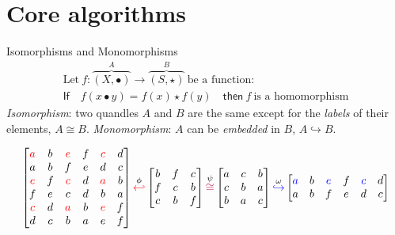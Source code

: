 \section{Core algorithms}
\frame{\sectionpage}

\begin{frame}{Isomorphisms and Monomorphisms}
\begin{multline*}
    \text{Let}~f:\overbrace{(X,\bullet)}^A\to\overbrace{(S,\star)}^B~\text{be a function:}\\  \textsf{If}\quad f(x\bullet y) = f(x)\star f(y)\quad \textsf{then}~f~\text{is a homomorphism}
\end{multline*}
\emph{Isomorphism}: two quandles $A$ and $B$ are the same except for the \emph{labels} of their elements, $A \cong B$.\newline
\emph{Monomorphism}: $A$ can be \emph{embedded} in $B$, $A \hookrightarrow B$.
\begin{center}
    \textcolor{darkred}{} 
\end{center}
\small
\[\begin{bmatrix}
     \textcolor{red}{a} & b & \textcolor{red}{e} & f & \textcolor{red}{c} & d \\
     a & b & f & e & d & c \\
     \textcolor{red}{e} & f & \textcolor{red}{c} & d & \textcolor{red}{a} & b \\
     f & e & c & d & b & a \\
     \textcolor{red}{c} & d & \textcolor{red}{a} & b & \textcolor{red}{e} & f \\
     d & c & b & a & e & f \\
\end{bmatrix} \overset{\phi}{\textcolor{red}{\hookleftarrow}}\begin{bmatrix}
b& f & c \\
f & c & b\\
c & b& f
\end{bmatrix}
\overset{\psi}{\textcolor{purple}{\cong}} \begin{bmatrix}
a& c & b \\
c & b & a\\
b & a& c
\end{bmatrix} \overset{\omega}{\textcolor{blue}{\hookrightarrow}}
\begin{bmatrix}
 \textcolor{blue}{a}& b& \textcolor{blue}{e}& f& \textcolor{blue}{c}& d \\
     a& b & f& e& d& c \\

\end{bmatrix}\]
\end{frame}
